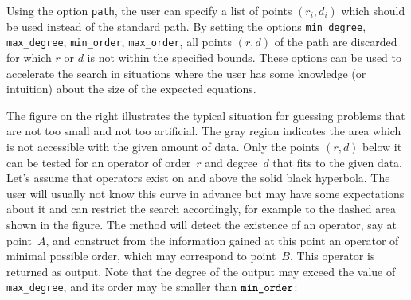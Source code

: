 \documentclass{llncs}
\begin{document}
Using the option \verb|path|, the user can specify a list of points $(r_i,d_i)$
which should be used instead of the standard path. By setting the options \verb|min_degree|,
\verb|max_degree|, \verb|min_order|, \verb|max_order|, all points $(r,d)$ of the path
are discarded for which $r$ or $d$ is not within the specified bounds. These options
can be used to accelerate the search in situations where the user has some knowledge
(or intuition) about the size of the expected equations. 

\hangindent=-6.3cm\leavevmode
{}%
The figure on the right illustrates the typical situation for guessing problems
that are not too small and not too artificial. The gray region indicates
the area which is not accessible with the given amount of data. Only the points
$(r,d)$ below it can be tested for an operator of order~$r$ and degree~$d$ that
fits to the given data. Let's assume that operators exist on and above the solid
black hyperbola. The user will usually not know this curve in advance but may
have some expectations about it and can restrict the search accordingly, for
example to the dashed area shown in the figure. The method will detect the
existence of an operator, say at point~$A$, and construct from the information
gained at this point an operator of minimal possible order, which may correspond
to point~$B$.  This operator is returned as output. Note that the degree of the
output may exceed the value of \verb|max_degree|, and its order may be smaller
than $\verb|min_order|$:
\end{document}
